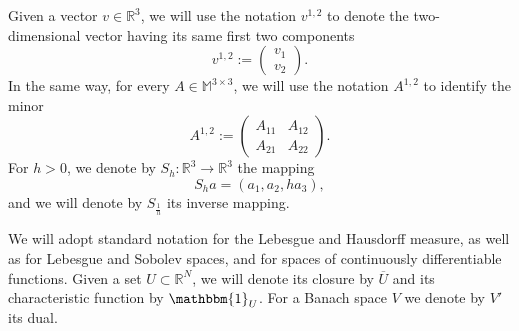 \documentclass[reqno,10pt]{amsart}
\numberwithin{equation}{section}
\theoremstyle{remark}
\newcommand{\M}{\mathbb{M}}
\newcommand{\R}{\mathbb{R}}
\newcommand{\closure}[1]{\overline{#1}}
\newcommand{\scaling}{{S}}
\newcommand{\charfun}[1]{\mathbbm{1}_{#1}}
\begin{document}
Given a vector $v \in \R^3$, we will use the notation $v^{1,2}$ to denote the two-dimensional vector having its same first two components
\begin{equation*}
	v^{1,2} := \begin{pmatrix} v_1 \\ v_2 \end{pmatrix}.
\end{equation*}
In the same way, for every $A \in \M^{3 \times 3}$, we will use the notation $A^{1,2}$ to identify the minor
\begin{equation*}
	A^{1,2} := \begin{pmatrix} A_{11} & A_{12} \\ A_{21} & A_{22} \end{pmatrix}.
\end{equation*}
For $h>0$, we denote by $\scaling_h : \R^3 \to \R^3$ the mapping
\begin{equation} \label{scaling S_h}
    \scaling_h a = (a_1,a_2, h a_3),
\end{equation}
and we will denote by $S_{\frac{1}{h}}$ its inverse mapping.

We will adopt standard notation for the Lebesgue and Hausdorff measure, as well as for Lebesgue and Sobolev spaces, and for spaces of continuously differentiable functions.
Given a set $U \subset \R^N$, we will denote its closure by $\closure{U}$ and its characteristic function by $\charfun{U}$.
For a Banach space $V$ we denote by $V'$ its dual.
\end{document}
